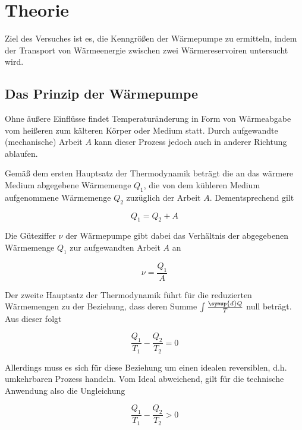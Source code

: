\section{Theorie}
\label{sec:Theorie}

Ziel des Versuches ist es, die Kenngrößen der Wärmepumpe zu 
ermitteln, indem der Transport von Wärmeenergie zwischen
zwei Wärmereservoiren untersucht wird.

\subsection{Das Prinzip der Wärmepumpe}

Ohne äußere Einflüsse findet Temperaturänderung in Form von Wärmeabgabe
vom heißeren zum kälteren Körper oder Medium statt. Durch aufgewandte 
(mechanische) Arbeit $A$ kann dieser Prozess jedoch auch in anderer
Richtung ablaufen. 

Gemäß dem ersten Hauptsatz der Thermodynamik beträgt 
die an das wärmere Medium abgegebene Wärmemenge $Q_1$, die von dem kühleren 
Medium aufgenommene Wärmemenge $Q_2$ zuzüglich der Arbeit $A$. Dementsprechend gilt

\begin{equation}
    Q_1 = Q_2 + A
    \label{eqn:Wärm}
\end{equation}

Die Güteziffer $\nu$ der Wärmepumpe gibt dabei das Verhältnis der abgegebenen 
Wärmemenge $Q_1$ zur aufgewandten Arbeit $A$ an

\begin{equation}
    \nu = \frac{Q_1}{A}
    \label{eqn:Güte}
\end{equation}

Der zweite Hauptsatz der Thermodynamik führt für die reduzierten Wärmemengen 
zu der Beziehung, dass deren Summe $\int \frac{\symup{d}Q}{T}$ null beträgt. 
Aus dieser folgt

\begin{equation}
    \frac{Q_1}{T_1} - \frac{Q_2}{T_2} = 0
    \label{eqn:redWärm}
\end{equation}

Allerdings muss es sich für diese Beziehung um einen idealen reversiblen, d.h. 
umkehrbaren Prozess handeln. Vom Ideal abweichend, gilt für die technische 
Anwendung also die Ungleichung

\begin{equation}
    \frac{Q_1}{T_1} - \frac{Q_2}{T_2} > 0
    \label{eqn:ungWärme}
\end{equation}

